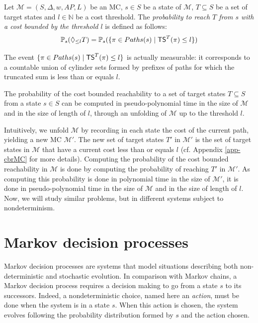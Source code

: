 \begin{definition}
	Let $\mathcal{M} = (S, \Delta, w, AP, L)$ be an MC, $s \in S$ be a state of $\mathcal{M}$, $T \subseteq S$ be a set of target states and $l \in \mathbb{N}$ be a cost threshold.
  The \textit{probability to reach $T$ from $s$ with a cost bounded by the threshold $l$} is defined as follows:
	\[
    \mathbb{P}_s(\Diamond_{\leq l} T) = \mathbb{P}_s(\{\pi \in Paths(s) \; | \; \text{\sffamily TS}^T(\pi) \leq l \})
  \]
\end{definition}
The event $\{\pi \in Paths(s) \; | \; \text{\sffamily TS}^T(\pi) \leq l \}$ is actually measurable: it corresponds to a countable union of cylinder sets formed by prefixes of paths for which the truncated sum is less than or equals $l$.%
\begin{theorem} \label{cost-bounded-thm}
  The probability of the cost bounded reachability to a set of target states $T \subseteq S$ from a state $s \in S$ can be computed in pseudo-polynomial time in the size of $\mathcal{M}$ and in the size of length of $l$, through an unfolding of $\mathcal{M}$ up to the threshold $l$.
\end{theorem}

Intuitively, we unfold $\mathcal{M}$ by recording in each state the cost of the
current path, yielding a new MC $\mathcal{M}'$. The new set of target states $T'$ in $\mathcal{M}'$ is the set of
target states in $\mathcal{M}$ that have a current cost less than or equals $l$ (cf.
Appendix \ref{app-cbrMC} for more details).
Computing the probability of the cost bounded reachability in $\mathcal{M}$ is done by computing the probability of reaching $T'$ in $\mathcal{M}'$.
As computing this probability is done in polynomial time in the size of $\mathcal{M}'$, it is done in pseudo-polynomial time in the size of $\mathcal{M}$ and in the size of length of $l$.
\\

Now, we will study similar problems, but in different systems subject to nondeterminism.

\section{Markov decision processes}
Markov decision processes are systems that model situations describing both non-deterministic and stochastic evolution.
In comparison with Markov chains, a Markov decision process requires a decision making to go from a state $s$ to its successors.
Indeed, a nondeterministic choice, named here an \textit{action}, must be done when the system is in a state $s$.
When this action is chosen, the system evolves following the probability distribution formed by $s$ and the action chosen.


